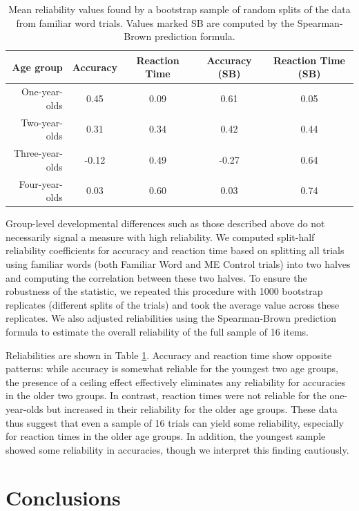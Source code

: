 \documentclass[man,noapacite]{apa2}
\begin{document}
\begin{table}[t]
\centering
\caption{\label{tab:reliability} Mean reliability values found by a bootstrap sample of random splits of the data from familiar word trials. Values marked SB are computed by the Spearman-Brown prediction formula.}
\begin{tabular}{rcccc}
  \hline
Age group & Accuracy & Reaction Time & Accuracy (SB) & Reaction Time (SB) \\ 
  \hline
One-year-olds & 0.45 & 0.09 & 0.61 & 0.05 \\ 
Two-year-olds & 0.31 & 0.34 & 0.42 & 0.44 \\ 
Three-year-olds & -0.12 & 0.49 & -0.27 & 0.64 \\ 
Four-year-olds & 0.03 & 0.60 & 0.03 & 0.74 \\ 
   \hline
\end{tabular}
\end{table}

Group-level developmental differences such as those described above do not necessarily signal a measure with high reliability. We computed split-half reliability coefficients for accuracy and reaction time based on splitting all trials using familiar words (both Familiar Word and ME Control trials) into two halves and computing the correlation between these two halves. To ensure the robustness of the statistic, we repeated this procedure with 1000 bootstrap replicates (different splits of the trials) and took the average value across these replicates. We also adjusted reliabilities using the Spearman-Brown prediction formula \cite{bartko1976} to estimate the overall reliability of the full sample of 16 items.

Reliabilities are shown in Table \ref{tab:reliability}. Accuracy and reaction time show opposite patterns: while accuracy is somewhat reliable for the youngest two age groups, the presence of a ceiling effect effectively eliminates any reliability for accuracies in the older two groups. In contrast, reaction times were not reliable for the one-year-olds but increased in their reliability for the older age groups. These data thus suggest that even a sample of 16 trials can yield some reliability, especially for reaction times in the older age groups. In addition, the youngest sample showed some reliability in accuracies, though we interpret this finding cautiously.

\section{Conclusions} 
\end{document}
